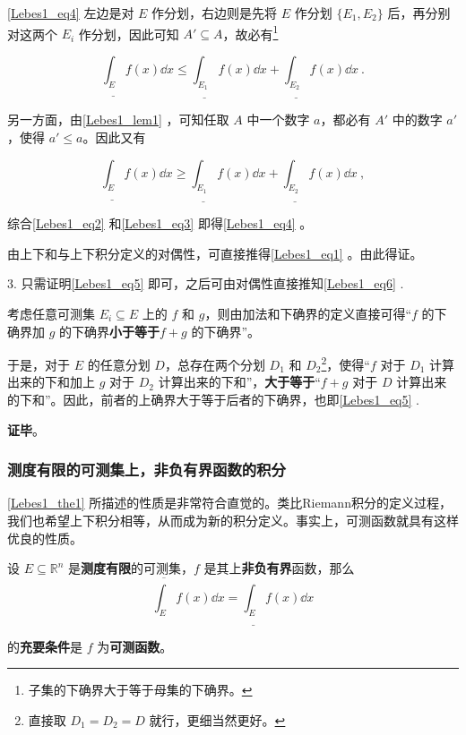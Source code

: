 \autoref{Lebes1_eq4} 左边是对 $E$ 作分划，右边则是先将 $E$ 作分划 $\{E_1, E_2\}$ 后，再分别对这两个 $E_i$ 作分划，因此可知 $A'\subseteq A$，故必有\footnote{子集的下确界大于等于母集的下确界。}

 \begin{equation}\label{Lebes1_eq2}
  \underline{\int_E} f(x) \dd x \leq \underline{\int_{E_1}} f(x) \dd x+\underline{\int_{E_2}} f(x) \dd x~.
  \end{equation}

另一方面，由\autoref{Lebes1_lem1} ，可知任取 $A$ 中一个数字 $a$，都必有 $A'$ 中的数字 $a'$，使得 $a'\leq a$。因此又有

\begin{equation}\label{Lebes1_eq3}
\underline{\int_E} f(x) \dd x \geq \underline{\int_{E_1}} f(x) \dd x+\underline{\int_{E_2}} f(x) \dd x~,
\end{equation}

综合\autoref{Lebes1_eq2} 和\autoref{Lebes1_eq3} 即得\autoref{Lebes1_eq4} 。

由上下和与上下积分定义的对偶性，可直接推得\autoref{Lebes1_eq1} 。由此得证。

3. 只需证明\autoref{Lebes1_eq5} 即可，之后可由对偶性直接推知\autoref{Lebes1_eq6} .

考虑任意可测集 $E_i\subseteq E$ 上的 $f$ 和 $g$，则由加法和下确界的定义直接可得“$f$ 的下确界加 $g$ 的下确界\textbf{小于等于}$f+g$ 的下确界”。

于是，对于 $E$ 的任意分划 $D$，总存在两个分划 $D_1$ 和 $D_2$\footnote{直接取 $D_1=D_2=D$ 就行，更细当然更好。}，使得“$f$ 对于 $D_1$ 计算出来的下和加上 $g$ 对于 $D_2$ 计算出来的下和”，\textbf{大于等于}“$f+g$ 对于 $D$ 计算出来的下和”。因此，前者的上确界大于等于后者的下确界，也即\autoref{Lebes1_eq5} .

\textbf{证毕}。







\subsubsection{测度有限的可测集上，非负有界函数的积分}


\autoref{Lebes1_the1} 所描述的性质是非常符合直觉的。类比Riemann积分的定义过程，我们也希望上下积分相等，从而成为新的积分定义。事实上，可测函数就具有这样优良的性质。

\begin{theorem}{}\label{Lebes1_the2}
设 $E\subseteq \mathbb{R}^n$ 是\textbf{测度有限}的可测集，$f$ 是其上\textbf{非负有界}函数，那么
\begin{equation}\label{Lebes1_eq7}
\overline{\int_E} f(x) \dd x = \underline{\int_E} f(x) \dd x
\end{equation}
\end{theorem}
的\textbf{充要条件}是 $f$ 为\textbf{可测函数}。


